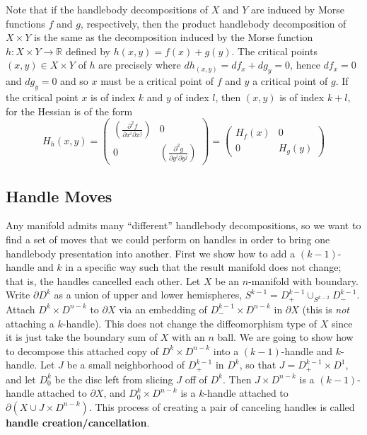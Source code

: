 Note that if the handlebody decompositions of $X$ and $Y$ are induced by Morse functions $f$ and $g$, respectively, then the product handlebody decomposition of $X \times Y$ is the same as the decomposition induced by the Morse function $h : X \times Y \rightarrow \mathbb R$ defined by $h(x,y) = f(x)+g(y)$. The critical points $(x,y) \in X \times Y$ of $h$ are precisely where $dh_{(x,y)} = df_x+dg_y = 0$, hence $df_x=0$ and $dg_y=0$ and so $x$ must be a critical point of $f$ and $y$ a critical point of $g$. If the critical point $x$ is of index $k$ and $y$ of index $l$, then $(x,y)$ is of index $k+l$, for the Hessian is of the form
\[ H_h(x,y) = \begin{pmatrix} \left( \frac{\partial^2 f}{\partial x^i \partial x^j} \right) & 0 \\ 0 & \left( \frac{\partial^2 g}{\partial y^i \partial y^j} \right) \end{pmatrix} = \begin{pmatrix} H_f(x) & 0 \\ 0 & H_g(y) \end{pmatrix} \]



\subsection{Handle Moves}
\label{Handle Moves}


Any manifold admits many ``different'' handlebody decompositions, so we want to find a set of moves that we could perform on handles in order to bring one handlebody presentation into another. First we show how to add a $(k-1)$-handle and $k$ in a specific way such that the result manifold does not change; that is, the handles cancelled each other. Let $X$ be an $n$-manifold with boundary. Write $\partial D^k$ as a union of upper and lower hemispheres, $S^{k-1} = D^{k-1}_+ \cup_{S^{k-2}} D^{k-1}_-$. Attach $D^k \times D^{n-k}$ to $\partial X$ via an embedding of $D_-^{k-1} \times D^{n-k}$ in $\partial X$ (this is \emph{not} attaching a $k$-handle). This does not change the diffeomorphism type of $X$ since it is just take the boundary sum of $X$ with an $n$ ball. We are going to show how to decompose this attached copy of $D^k \times D^{n-k}$ into a $(k-1)$-handle and $k$-handle. Let $J$ be a small neighborhood of $D_+^{k-1}$ in $D^k$, so that $J = D_+^{k-1} \times D^1$, and let $D_0^k$ be the disc left from slicing $J$ off of $D^k$. Then $J \times D^{n-k}$ is a $(k-1)$-handle attached to $\partial X$, and $D_0^k \times D^{n-k}$ is a $k$-handle attached to $\partial(X \cup J \times D^{n-k})$. This process of creating a pair of canceling handles is called \textbf{handle creation/cancellation}.

